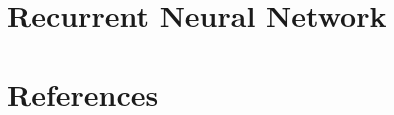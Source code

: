 % 

% 
% 
% 
% 

% 
% 
% 

% 
% 

% 

\section[RNN]{Recurrent Neural Network}



% 
% 

 
 
% 


 \section[Refs]{References}
 
